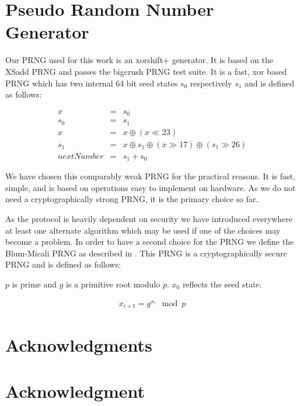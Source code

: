 \documentclass[9pt,journal,compsoc]{IEEEtran}
\begin{document}
\section{Pseudo Random Number Generator\label{sec:prng}}
Our PRNG used for this work is an xorshift+ generator. It is based on the XSadd PRNG\cite{marsaglia2003xorshift} and passes the bigcrush PRNG test suite. It is a fast, xor based PRNG which has two internal 64 bit seed states $s_0$ respectively $s_1$ and is defined as follows:

\begin{eqnarray}
x & = & s_0\\
s_0 & = & s_1\\
x & = & x \oplus ( x \ll 23 )\\
s_1 & = & x \oplus s_1 \oplus ( x \gg 17 ) \oplus (s_1 \gg 26 )\\
nextNumber & = & s_1+s_0
\end{eqnarray}

We have chosen this comparably weak PRNG for the practical reasons. It is fast, simple, and is based on operations easy to implement on hardware. As we do not need a cryptographically strong PRNG, it is the primary choice so far. 

As the protocol is heavily dependent on security we have introduced everywhere at least one alternate algorithm which may be used if one of the choices may become a problem. In order to have a second choice for the PRNG we define the Blum-Micali PRNG as described in \cite{blum1984generate}. This PRNG is a cryptographically secure PRNG and is defined as follows:

$p$ is prime and $g$ is a primitive root modulo $p$. $x_0$ reflects the seed state.

\begin{eqnarray}
x_{i+1}=g^{x_i}\mod p
\end{eqnarray}



\ifCLASSOPTIONcompsoc
  \section*{Acknowledgments}
\else
  \section*{Acknowledgment}
\fi
\end{document}
